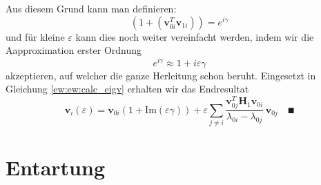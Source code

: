 Aus diesem Grund kann man definieren:
\begin{equation}
    ( 1 + (\bm v_{0i}^T \bm v_{1i}) ) = e^{i\gamma}
\end{equation}
und für kleine $\varepsilon$ kann dies noch weiter vereinfacht werden, indem wir die Aapproximation erster Ordnung
\begin{equation}
    e^{i\gamma} \approx 1 + i \varepsilon \gamma
\end{equation}
akzeptieren, auf welcher die ganze Herleitung schon beruht.
Eingesetzt in Gleichung \eqref{ew:ew:calc_eigv} erhalten wir das Endresultat
\begin{equation}
    \bm v_i(\varepsilon)
    =
    \bm v_{0i} ( 1 + \mathrm{Im}(\varepsilon \gamma) ) + \varepsilon \sum_{j \neq i}
    \frac{\bm v_{0j}^T \bm H_1 \bm v_{0i}}{\lambda_{0i} - \lambda_{0j}}
    \, \bm v_{0j}
    \quad
    \QED
    \label{ew:eq:explicit_eigvecs}
\end{equation}



\section{Entartung}

